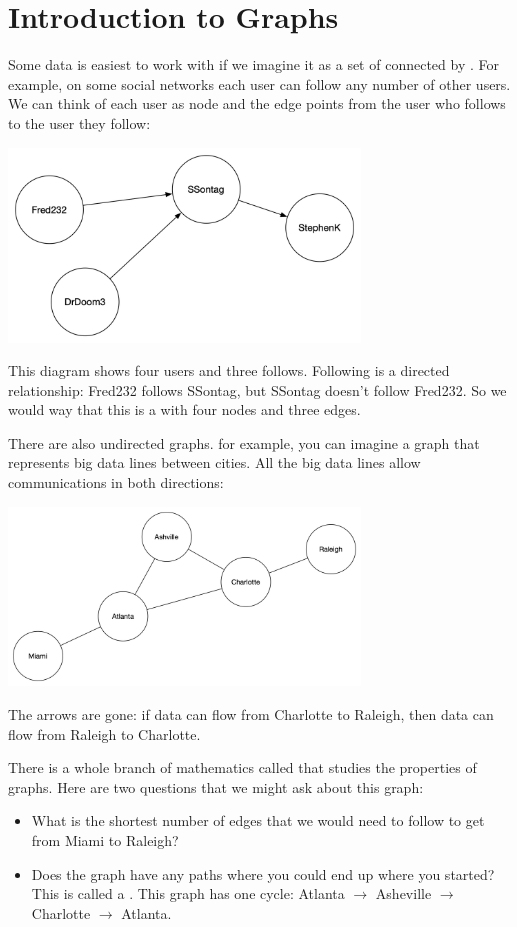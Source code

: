 \chapter{Introduction to Graphs}

Some data is easiest to work with if we imagine it as a set of
 connected by .  For example, on some
social networks each user can follow any number of other users.  We
can think of each user as node and the edge points from the user who
follows to the user they follow:

\includegraphics[width=0.7\textwidth]{simpledirected.png}

This diagram shows four users and three follows.  Following is a
directed relationship: Fred232 follows SSontag, but SSontag doesn't
follow Fred232.  So we would way that this is a  with four nodes and three edges.

There are also undirected graphs.  for example, you can imagine a
graph that represents big data lines between cities.  All the big data
lines allow communications in both directions:

\includegraphics[width=0.7\textwidth]{simpleundirected.png}

The arrows are gone: if data can flow from Charlotte to Raleigh, then
data can flow from Raleigh to Charlotte.

There is a whole branch of mathematics called 
that studies the properties of graphs.  Here are two questions that we
might ask about this graph:
\begin{itemize}
\item What is the shortest number of edges that we would need to follow to get from Miami to Raleigh?
\item Does the graph have any paths where you could end up where you
  started? This is called a .  This graph has one
  cycle: Atlanta $\rightarrow$ Asheville $\rightarrow$ Charlotte
  $\rightarrow$ Atlanta.
\end{itemize}

